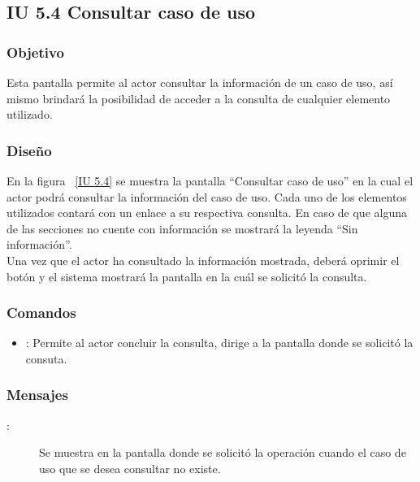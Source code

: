 \subsection{IU 5.4 Consultar caso de uso}

\subsubsection{Objetivo}
	
	Esta pantalla permite al actor consultar la información de un caso de uso, así mismo brindará la posibilidad de acceder a la consulta de cualquier elemento utilizado.

\subsubsection{Diseño}

    En la figura ~\ref{IU 5.4} se muestra la pantalla ``Consultar caso de uso'' en la cual el actor podrá consultar la información del caso de uso. Cada uno de los elementos utilizados contará con un enlace a su respectiva consulta. En caso de que alguna de las secciones no cuente con información se mostrará la leyenda ``Sin información''. \\
	
	Una vez que el actor ha consultado la información mostrada, deberá oprimir el botón  y el sistema mostrará la pantalla en la cuál se solicitó la consulta.


\subsubsection{Comandos}
\begin{itemize}
	\item {}: Permite al actor concluir la consulta, dirige a la pantalla donde se solicitó la consuta.
\end{itemize}

\subsubsection{Mensajes}
	
\begin{description}
	\item[:] Se muestra en la pantalla donde se solicitó la operación cuando el caso de uso que se desea consultar no existe.
\end{description}
